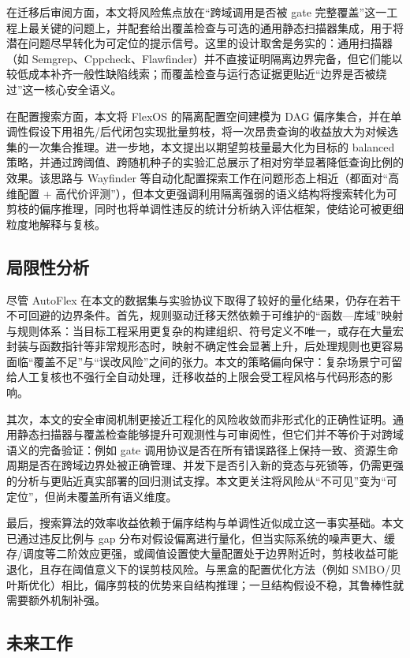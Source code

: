 \documentclass[UTF8,a4paper,12pt,twoside]{ctexart}  %
\begin{document}
在迁移后审阅方面，本文将风险焦点放在``跨域调用是否被 gate 完整覆盖''这一工程上最关键的问题上，并配套给出覆盖检查与可选的通用静态扫描器集成，用于将潜在问题尽早转化为可定位的提示信号。这里的设计取舍是务实的：通用扫描器（如 Semgrep、Cppcheck、Flawfinder\cite{11,12,13}）并不直接证明隔离边界完备，但它们能以较低成本补齐一般性缺陷线索；而覆盖检查与运行态证据更贴近``边界是否被绕过''这一核心安全语义。

在配置搜索方面，本文将 FlexOS 的隔离配置空间建模为 DAG 偏序集合，并在单调性假设下用祖先/后代闭包实现批量剪枝，将一次昂贵查询的收益放大为对候选集的一次集合推理。进一步地，本文提出以期望剪枝量最大化为目标的 balanced 策略，并通过跨阈值、跨随机种子的实验汇总展示了相对穷举显著降低查询比例的效果。该思路与 Wayfinder 等自动化配置探索工作\cite{3}在问题形态上相近（都面对``高维配置 + 高代价评测''），但本文更强调利用隔离强弱的语义结构将搜索转化为可剪枝的偏序推理，同时也将单调性违反的统计分析纳入评估框架，使结论可被更细粒度地解释与复核。

\subsection{局限性分析}

尽管 AutoFlex 在本文的数据集与实验协议下取得了较好的量化结果，仍存在若干不可回避的边界条件。首先，规则驱动迁移天然依赖于可维护的``函数—库域''映射与规则体系：当目标工程采用更复杂的构建组织、符号定义不唯一，或存在大量宏封装与函数指针等非常规形态时，映射不确定性会显著上升，后处理规则也更容易面临``覆盖不足''与``误改风险''之间的张力。本文的策略偏向保守：复杂场景宁可留给人工复核也不强行全自动处理，迁移收益的上限会受工程风格与代码形态的影响。

其次，本文的安全审阅机制更接近工程化的风险收敛而非形式化的正确性证明。通用静态扫描器\cite{11,12,13}与覆盖检查能够提升可观测性与可审阅性，但它们并不等价于对跨域语义的完备验证：例如 gate 调用协议是否在所有错误路径上保持一致、资源生命周期是否在跨域边界处被正确管理、并发下是否引入新的竞态与死锁等，仍需更强的分析与更贴近真实部署的回归测试支撑。本文更关注将风险从``不可见''变为``可定位''，但尚未覆盖所有语义维度。

最后，搜索算法的效率收益依赖于偏序结构与单调性近似成立这一事实基础。本文已通过违反比例与 gap 分布对假设偏离进行量化，但当实际系统的噪声更大、缓存/调度等二阶效应更强，或阈值设置使大量配置处于边界附近时，剪枝收益可能退化，且存在阈值意义下的误剪枝风险。与黑盒的配置优化方法（例如 SMBO/贝叶斯优化\cite{24,25}）相比，偏序剪枝的优势来自结构推理；一旦结构假设不稳，其鲁棒性就需要额外机制补强。

\subsection{未来工作}
\end{document}
